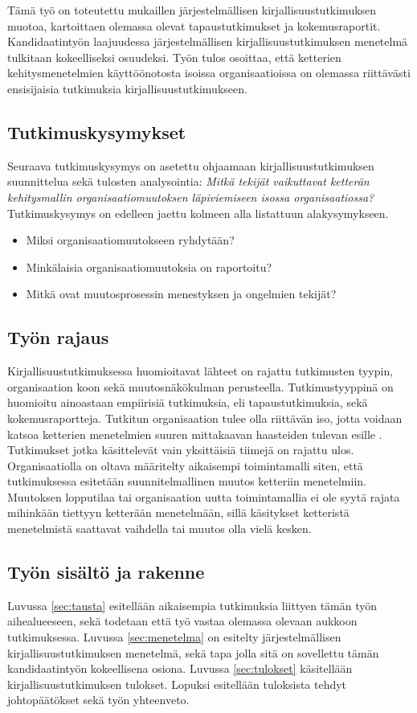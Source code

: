 Tämä työ on toteutettu mukaillen järjestelmällisen kirjallisuustutkimuksen
muotoa, kartoittaen olemassa olevat tapaustutkimukset ja kokemusraportit.
Kandidaatintyön laajuudessa järjestelmällisen kirjallisuustutkimuksen menetelmä
tulkitaan kokeelliseksi osuudeksi. Työn tulos osoittaa, että ketterien
kehitysmenetelmien käyttöönotosta isoissa organisaatioissa on olemassa
riittävästi ensisijaisia tutkimuksia kirjallisuustutkimukseen.

\subsection{Tutkimuskysymykset}
Seuraava tutkimuskysymys on asetettu ohjaamaan kirjallisuustutkimuksen
suunnittelua sekä tulosten analysointia:
\textit{Mitkä tekijät vaikuttavat ketterän kehitysmallin organisaatiomuutoksen
läpiviemiseen isossa organisaatiossa?} Tutkimuskysymys on edelleen jaettu
kolmeen alla listattuun alakysymykseen.

\begin{itemize}
\item Miksi organisaatiomuutokseen ryhdytään?
\item Minkälaisia organisaatiomuutoksia on raportoitu?
\item Mitkä ovat muutosprosessin menestyksen ja ongelmien tekijät?
\end{itemize}

\subsection{Työn rajaus}
Kirjallisuustutkimuksessa huomioitavat lähteet on rajattu tutkimusten tyypin,
organisaation koon sekä muutosnäkökulman perusteella. Tutkimustyyppinä on
huomioitu ainoastaan empiirisiä tutkimuksia, eli tapaustutkimuksia, sekä
kokemusraportteja. Tutkitun organisaation tulee olla riittävän iso, jotta
voidaan katsoa ketterien menetelmien suuren mittakaavan haasteiden tulevan
esille \citep{Lindvall2004}. Tutkimukset jotka käsittelevät vain yksittäisiä
tiimejä on rajattu ulos. Organisaatiolla on oltava määritelty aikaisempi
toimintamalli siten, että tutkimuksessa esitetään suunnitelmallinen muutos
ketteriin menetelmiin. Muutoksen lopputilaa tai organisaation uutta
toimintamallia ei ole syytä rajata mihinkään tiettyyn ketterään menetelmään,
sillä käsitykset ketteristä menetelmistä saattavat vaihdella tai muutos olla
vielä kesken.

\subsection{Työn sisältö ja rakenne}
Luvussa \ref{sec:tausta} esitellään aikaisempia tutkimuksia liittyen tämän työn
aihealueeseen, sekä todetaan että työ vastaa olemassa olevaan aukkoon
tutkimuksessa. Luvussa \ref{sec:menetelma} on esitelty järjestelmällisen
kirjallisuustutkimuksen menetelmä, sekä tapa jolla sitä on sovellettu tämän
kandidaatintyön kokeellisena osiona. Luvussa \ref{sec:tulokset} käsitellään
kirjallisuustutkimuksen tulokset. Lopuksi esitellään tuloksista tehdyt
johtopäätökset sekä työn yhteenveto.


